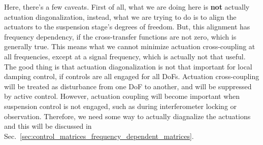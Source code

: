 Here, there's a few caveats.
First of all, what we are doing here is \textbf{not} actually actuation diagonalization, instead, what we are trying to do is to align the actuators to the suspension stage's degrees of freedom.
But, this alignment has frequency dependency, if the cross-transfer functions are not zero, which is generally true.
This means what we cannot minimize actuation cross-coupling at all frequencies, except at a signal frequency, which is actually not that useful.
The good thing is that actuation diagonalization is not that important for local damping control, if controls are all engaged for all DoFs.
Actuation cross-coupling will be treated as disturbance from one DoF to another, and will be suppressed by active control.
However, actuation coupling will become important when suspension control is not engaged, such as during interferometer locking or observation.
Therefore, we need some way to actually diagnalize the actuations and this will be discussed in Sec.~\ref{sec:control_matrices_frequency_dependent_matrices}.

